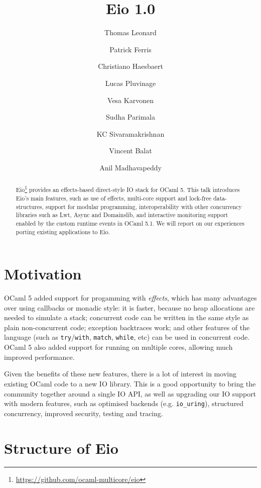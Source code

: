 \documentclass[a4paper,twocolumn]{article}
\begin{document}
\title{Eio 1.0}
\author{Thomas Leonard\and
        Patrick Ferris\and
        Christiano Haesbaert\and
        Lucas Pluvinage\and
        Vesa Karvonen\and
        Sudha Parimala\and
        KC Sivaramakrishnan\and
	Vincent Balat\and
        Anil Madhavapeddy}
\maketitle

\begin{abstract}

Eio\footnote{\url{https://github.com/ocaml-multicore/eio}} provides an effects-based direct-style IO stack for OCaml 5. This talk introduces Eio's main features, such as use of effects, multi-core support and lock-free data-structures, support for modular programming, interoperability with other concurrency libraries such as Lwt, Async and Domainslib, and interactive monitoring support enabled by the custom runtime events in OCaml 5.1.
We will report on our experiences porting existing applications to Eio.

\end{abstract}

\section*{Motivation}

OCaml 5 added support for progamming with \emph{effects}, which has many advantages over using callbacks or monadic style: it is faster, because no heap allocations are needed to simulate a stack; concurrent code can be written in the same style as plain non-concurrent code; exception backtraces work; and other features of the language (such as {\tt try}/{\tt with}, {\tt match}, {\tt while}, etc) can be used in concurrent code.
OCaml 5 also added support for running on multiple cores, allowing much improved performance.

Given the benefits of these new features, there is a lot of interest in moving existing OCaml code to a new IO library.
This is a good opportunity to bring the community together around a single IO API, as well as upgrading our IO support with modern features, such as optimised backends (e.g. \verb|io_uring|), structured concurrency, improved security, testing and tracing.

\section*{Structure of Eio}
\end{document}
